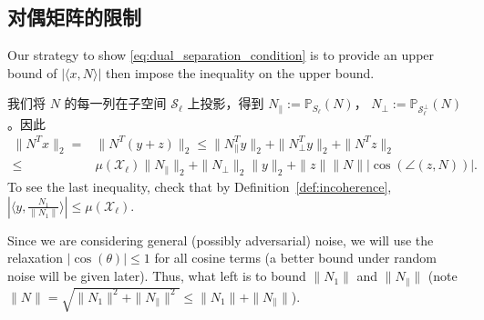 \documentclass{ctexart}
\begin{document}
\subsection{对偶矩阵的限制}\label{sec:dual_separation}

Our strategy to show \eqref{eq:dual_separation_condition} is to provide an upper bound of $|\langle x, N \rangle|$ then impose the inequality on the upper bound.

我们将 $N$ 的每一列在子空间 $\mathcal{S}_{\ell}$ 上投影，得到 $N_{\parallel} :=\mathbb{P}_{S_\ell}(N)$，
$N_{\perp} := \mathbb{P}_{\mathcal{S}_{\ell}^\perp}(N)$。因此
\begin{align}\label{eq:showing_dual_sep_cond}
  \| N^T x \|_2 =& \| N^T (y+z)\|_2 \leq \| N_{\parallel}^T y\|_2+\|
  N_{\perp}^T y\|_2+\|N^T z\|_2\\
  \leq& \mu(\mathcal{X}_{\ell}) \|N_{\parallel}\|_2 + \|N_{\perp}\|_2\|y\|_2
  + \|z\|\|N\||\cos(\angle (z,N))|.
\end{align}
To see the last inequality, check that by Definition~\ref{def:incoherence}, $|\langle y,\frac{N_1}{\|N_1\|}\rangle| \leq\mu(\mathcal{X}_{\ell})$.

Since we are considering general (possibly adversarial) noise, we will use the relaxation $|\cos(\theta)|\leq 1$ for all cosine terms (a better bound under random noise will be given later). Thus, what left is to bound $\|N_1\|$ and $\|N_{\parallel}\|$ (note $\|N\|=\sqrt{\|N_1\|^2+\|N_{\parallel}\|^2} \leq \|N_1\|+\|N_{\parallel}\|$).
\end{document}
